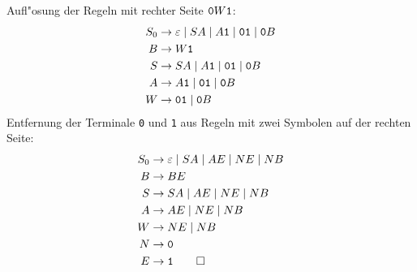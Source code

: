 \begin{loesung}
Aufl"osung der Regeln mit rechter Seite ${\tt 0}W{\tt 1}$:
\begin{align*}
S_0&\to \varepsilon\;|\;SA\;|\;A{\tt 1}\;|\;{\tt 01}\;|\;{\tt 0}B\\
B  &\to W{\tt 1}\\
S  &\to SA\;|\;A{\tt 1}\;|\;{\tt 01}\;|\;{\tt 0}B\\
A  &\to A{\tt 1}\;|\;{\tt 01}\;|\;{\tt 0}B\\
W  &\to {\tt 01}\;|\; {\tt 0}B
\end{align*}
Entfernung der Terminale {\tt 0} und {\tt 1} aus Regeln mit zwei Symbolen
auf der rechten Seite:
\begin{align*}
S_0&\to \varepsilon\;|\;SA\;|\;AE\;|\;NE\;|\;NB\\
B  &\to BE\\
S  &\to SA\;|\;AE\;|\;NE\;|\;NB\\
A  &\to AE\;|\;NE\;|\;NB\\
W  &\to NE\;|\; NB\\
N  &\to {\tt 0}\\
E  &\to {\tt 1}
\qedhere
\end{align*}
\end{loesung}
